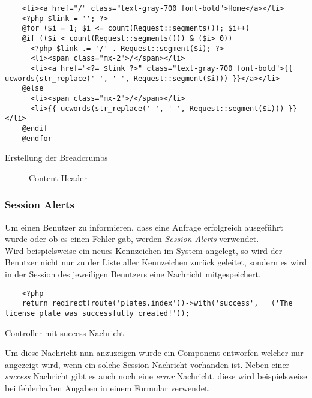 \begin{listing}[H]
  \begin{verbatim}
    <li><a href="/" class="text-gray-700 font-bold">Home</a></li>
    <?php $link = ''; ?>
    @for ($i = 1; $i <= count(Request::segments()); $i++)
    @if (($i < count(Request::segments())) & ($i> 0))
      <?php $link .= '/' . Request::segment($i); ?>
      <li><span class="mx-2">/</span></li>
      <li><a href="<?= $link ?>" class="text-gray-700 font-bold">{{ ucwords(str_replace('-', ' ', Request::segment($i))) }}</a></li>
    @else 
      <li><span class="mx-2">/</span></li>
      <li>{{ ucwords(str_replace('-', ' ', Request::segment($i))) }}</li>
    @endif
    @endfor
  \end{verbatim}
  \caption{Erstellung der Breadcrumbs}
\end{listing}

\begin{figure}[H]
  \centering
  \caption{Content Header}
\end{figure}

\subsubsection{Session Alerts}
Um einen Benutzer zu informieren, dass eine Anfrage erfolgreich ausgeführt wurde
oder ob es einen Fehler gab, werden \textit{Session Alerts} verwendet.\\

Wird beispielsweise ein neues Kennzeichen im System angelegt, so wird der
Benutzer nicht nur zu der Liste aller Kennzeichen zurück geleitet, sondern es wird in
der Session des jeweiligen Benutzers eine Nachricht mitgespeichert.

\begin{listing}[H]
  \begin{verbatim}
    <?php
    return redirect(route('plates.index'))->with('success', __('The license plate was successfully created!'));
  \end{verbatim}
  \caption{Controller mit success Nachricht}
\end{listing}

Um diese Nachricht nun anzuzeigen wurde ein Component entworfen welcher nur
angezeigt wird, wenn ein solche Session Nachricht vorhanden ist. Neben einer
\textit{success} Nachricht gibt es auch noch eine \textit{error} Nachricht,
diese wird beispielsweise bei fehlerhaften Angaben in einem Formular verwendet.

